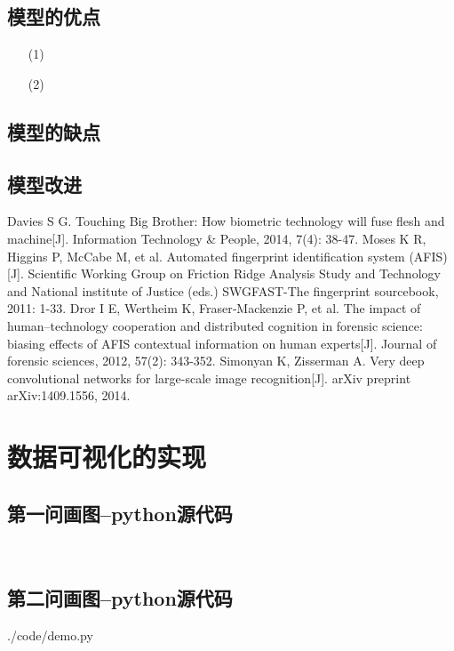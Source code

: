 \documentclass{whutmod}
\begin{document}
		\subsection{模型的优点}
			\begin{itemize}                                             
			\item [(1)]
			\item [(2)] 	
			\end{itemize}
		\subsection{模型的缺点}

  		\subsection{模型改进}

  
  
 
	\newpage	%
	\nocite{*}		%
	\begin{thebibliography}{9}%
		Davies S G. Touching Big Brother: How biometric technology will fuse flesh and machine[J]. Information Technology \& People, 2014, 7(4): 38-47.
	Moses K R, Higgins P, McCabe M, et al. Automated fingerprint identification system (AFIS)[J]. Scientific Working Group on Friction Ridge Analysis Study and Technology and National institute of Justice (eds.) SWGFAST-The fingerprint sourcebook, 2011: 1-33.
	Dror I E, Wertheim K, Fraser‐Mackenzie P, et al. The impact of human–technology cooperation and distributed cognition in forensic science: biasing effects of AFIS contextual information on human experts[J]. Journal of forensic sciences, 2012, 57(2): 343-352.
	Simonyan K, Zisserman A. Very deep convolutional networks for large-scale image recognition[J]. arXiv preprint arXiv:1409.1556, 2014.
	\end{thebibliography}

	\newpage
	\appendix %
	\section{数据可视化的实现}
		\subsection*{第一问画图--python源代码}
			\begin{lstlisting}[language=python]
			
			\end{lstlisting}
			
		\subsection*{第二问画图--python源代码}
			 {./code/demo.py}
\end{document}
